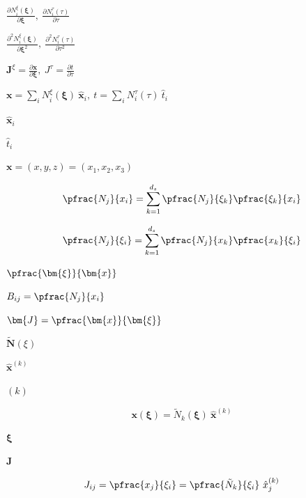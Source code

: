 \documentclass{article}
\begin{document}
$ \frac{\partial N_i^{\xi}(\boldsymbol{\xi})}{\partial \boldsymbol{\xi}},\ \frac{\partial N_i^{\tau}(\tau)}{\partial \tau} $
\pagebreak

$ \frac{\partial^2 N_i^{\xi}(\boldsymbol{\xi})}{\partial \boldsymbol{\xi}^2},\ \frac{\partial^2 N_i^{\tau}(\tau)}{\partial \tau^2} $
\pagebreak

$ \mathbf{J}^{\xi} = \frac{\partial \mathbf{x}}{\partial \boldsymbol{\xi}},\ J^{\tau} = \frac{\partial t}{\partial \tau} $
\pagebreak

$ \mathbf{x} = \sum_i N_i^{\xi}(\boldsymbol{\xi})\ \hat{\mathbf{x}}_i,\ t = \sum_i N_i^{\tau}(\tau)\ \hat{t}_i $
\pagebreak

$ \hat{\mathbf{x}}_i $
\pagebreak

$ \hat{t}_i $
\pagebreak

$ \bm{x} = (x,y,z) = (x_1,x_2,x_3) $
\pagebreak

\[ \begin{equation}\label{eqn:transformation_theorem}
    \pfrac{N_j}{x_i} = \sum_{k=1}^{d_s} \pfrac{N_j}{\xi_k} \pfrac{\xi_k}{x_i}
\end{equation} \]
\pagebreak

\[ \begin{equation}\label{eqn:transformation_theorem_invers}
    \pfrac{N_j}{\xi_i} = \sum_{k=1}^{d_s} \pfrac{N_j}{x_k} \pfrac{x_k}{\xi_i}
\end{equation} \]
\pagebreak

$ \pfrac{\bm{\xi}}{\bm{x}} $
\pagebreak

$ B_{ij} = \pfrac{N_j}{x_i} $
\pagebreak

$ \bm{J} = \pfrac{\bm{x}}{\bm{\xi}} $
\pagebreak

$ \tilde{\bm{N}}(\xi) $
\pagebreak

$ \bm{\hat{x}}^{(k)} $
\pagebreak

$ (k) $
\pagebreak

\[ \begin{equation} \label{eqn:geometry_interpolation}
    \bm{x}(\bm{\xi}) = \tilde{N}_k(\bm{\xi}) \ \bm{\hat{x}}^{(k)}
\end{equation} \]
\pagebreak

$ \bm{\xi} $
\pagebreak

$ \bm{J} $
\pagebreak

\[ \begin{equation}\label{eqn:1st_geometric_derivatives}
    J_{ij} = \pfrac{x_j}{\xi_i} = \pfrac{\tilde{N}_k}{\xi_i} \ \hat{x}_j^{(k)}
\end{equation} \]
\pagebreak
\end{document}
